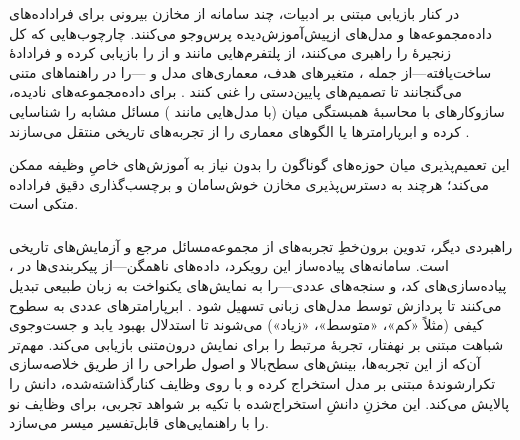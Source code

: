 در کنار بازیابی مبتنی بر ادبیات، چند سامانه از مخازن بیرونی برای فراداده‌های داده‌مجموعه‌ها و مدل‌های ازپیش‌آموزش‌دیده پرس‌وجو می‌کنند. چارچوب‌هایی که کل زنجیرهٔ  را راهبری می‌کنند،  از پلتفرم‌هایی مانند  و  از  را بازیابی کرده و فرادادهٔ ساخت‌یافته—از جمله ، متغیرهای هدف، معماری‌های مدل و —را در راهنماهای متنی می‌گنجانند تا تصمیم‌های پایین‌دستی را غنی کنند \cite{trirat2025automlagent, shen2023HuggingGPT}. برای داده‌مجموعه‌های نادیده، سازوکارهای  با محاسبهٔ همبستگی میان  (با مدل‌هایی مانند ) مسائل مشابه را شناسایی کرده و ابرپارامترها یا الگوهای معماری را از تجربه‌های تاریخی منتقل می‌سازند \cite{zhang2023AutomlGPTAutomaticMachineLearning}.

این  تعمیم‌پذیری میان حوزه‌های گوناگون را بدون نیاز به آموزش‌های خاصِ وظیفه ممکن می‌کند؛ هرچند به دسترس‌پذیری مخازن خوش‌سامان و برچسب‌گذاری دقیق فراداده متکی است.

\subsubsection{\protect{}}

راهبردی دیگر، تدوین برون‌خطِ تجربه‌های  از مجموعه‌مسائل مرجع و آزمایش‌های تاریخی است. سامانه‌های پیاده‌ساز این رویکرد، داده‌های ناهمگن—از پیکربندی‌ها در ، پیاده‌سازی‌های کد، و سنجه‌های عددی—را به نمایش‌های یکنواخت به زبان طبیعی تبدیل می‌کنند تا پردازش توسط مدل‌های زبانی تسهیل شود \cite{zhang-etal-2024-MLCopilot}. ابرپارامترهای عددی به سطوح کیفی (مثلاً «کم»، «متوسط»، «زیاد»)  می‌شوند تا استدلال بهبود یابد و جست‌وجوی شباهت مبتنی بر نهفتار،  تجربهٔ مرتبط را برای نمایش درون‌متنی بازیابی می‌کند. مهم‌تر آن‌که  از این تجربه‌ها، بینش‌های سطح‌بالا و اصول طراحی را از طریق خلاصه‌سازی تکرارشوندهٔ مبتنی بر مدل استخراج کرده و با  روی وظایف کنارگذاشته‌شده، دانش  را پالایش می‌کند. این مخزنِ دانشِ استخراج‌شده با تکیه بر شواهد تجربی،  برای وظایف نو را با راهنمایی‌های قابل‌تفسیر میسر می‌سازد.

